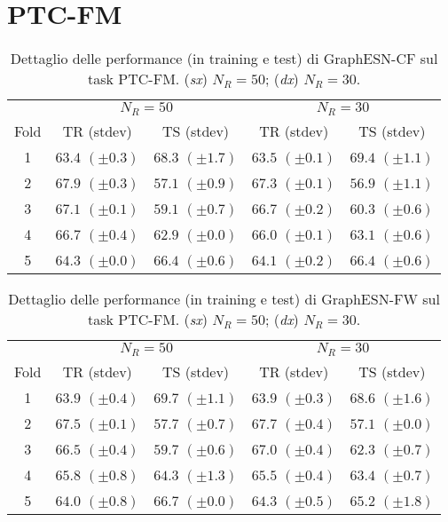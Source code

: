 \section{PTC-FM}


\begin{table}[tbph]
\footnotesize
\caption[Dettaglio performance: GraphESN-CF su PTC-FM]{Dettaglio delle performance (in training e test) di GraphESN-CF sul task PTC-FM. (\emph{sx}) $N_R=50$; (\emph{dx}) $N_R=30$.}
\label{app:esp:PTC-FM-CF}
\centering
\begin{tabular}{c*{4}{c}}
\toprule
& \multicolumn{2}{c}{$N_R=50$} & \multicolumn{2}{c}{$N_R=30$}\\
Fold & TR (stdev) & TS (stdev) & TR (stdev) & TS (stdev)\\
\midrule
1 & $63.4$ $(\pm 0.3)$ & $68.3$ $(\pm 1.7)$ & $63.5$ $(\pm 0.1)$ & $69.4$ $(\pm 1.1)$\\
2 & $67.9$ $(\pm 0.3)$ & $57.1$ $(\pm 0.9)$ & $67.3$ $(\pm 0.1)$ & $56.9$ $(\pm 1.1)$\\
3 & $67.1$ $(\pm 0.1)$ & $59.1$ $(\pm 0.7)$ & $66.7$ $(\pm 0.2)$ & $60.3$ $(\pm 0.6)$\\
4 & $66.7$ $(\pm 0.4)$ & $62.9$ $(\pm 0.0)$ & $66.0$ $(\pm 0.1)$ & $63.1$ $(\pm 0.6)$\\
5 & $64.3$ $(\pm 0.0)$ & $66.4$ $(\pm 0.6)$ & $64.1$ $(\pm 0.2)$ & $66.4$ $(\pm 0.6)$\\
\bottomrule
\end{tabular}
\end{table}



\begin{table}[tbph]
\footnotesize
\caption[Dettaglio performance: GraphESN-FW su PTC-FM]{Dettaglio delle performance (in training e test) di GraphESN-FW sul task PTC-FM. (\emph{sx}) $N_R=50$; (\emph{dx}) $N_R=30$.}
\label{app:esp:PTC-FM-FW}
\centering
\begin{tabular}{c*{4}{c}}
\toprule
& \multicolumn{2}{c}{$N_R=50$} & \multicolumn{2}{c}{$N_R=30$}\\
Fold & TR (stdev) & TS (stdev) & TR (stdev) & TS (stdev)\\
\midrule
1 & $63.9$ $(\pm 0.4)$ & $69.7$ $(\pm 1.1)$ & $63.9$ $(\pm 0.3)$ & $68.6$ $(\pm 1.6)$\\
2 & $67.5$ $(\pm 0.1)$ & $57.7$ $(\pm 0.7)$ & $67.7$ $(\pm 0.4)$ & $57.1$ $(\pm 0.0)$\\
3 & $66.5$ $(\pm 0.4)$ & $59.7$ $(\pm 0.6)$ & $67.0$ $(\pm 0.4)$ & $62.3$ $(\pm 0.7)$\\
4 & $65.8$ $(\pm 0.8)$ & $64.3$ $(\pm 1.3)$ & $65.5$ $(\pm 0.4)$ & $63.4$ $(\pm 0.7)$\\
5 & $64.0$ $(\pm 0.8)$ & $66.7$ $(\pm 0.0)$ & $64.3$ $(\pm 0.5)$ & $65.2$ $(\pm 1.8)$\\
\bottomrule
\end{tabular}
\end{table}

